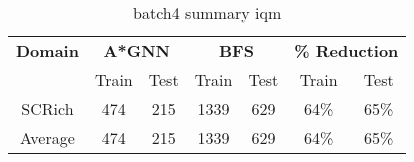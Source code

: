 \begin{table}[!ht]
  \small
  \centering
  \begin{tabular}{c|cc|cc|cc}
    \textbf{Domain}
      & \multicolumn{2}{c|}{\textbf{A*GNN}}
      & \multicolumn{2}{c|}{\textbf{BFS}}
      & \multicolumn{2}{c}{\textbf{\% Reduction}} \\
    \cline{2-7}
    & Train & Test & Train & Test & Train & Test \\
    \hline

    SCRich & 474 & 215 & 1339 & 629 & 64\% & 65\% \\
    \hline
    Average & 474 & 215 & 1339 & 629 & 64\% & 65\% \\

  \end{tabular}
  \caption{batch4 summary iqm}
  \label{tab:batch4_res}
\end{table}
